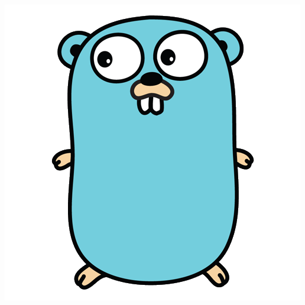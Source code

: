 \documentclass[pdf]{beamer}
\begin{document}
\subsection{}
\begin{frame}{}
    \begin{center}
        \includegraphics[height=.9\textheight]{gopher}
    \end{center}
\end{frame}
\end{document}
